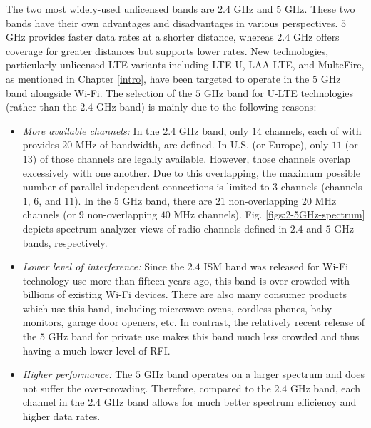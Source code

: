 The two most widely-used unlicensed bands are $2.4$ GHz and $5$ GHz. These two bands have their own advantages and disadvantages in various perspectives. $5$ GHz provides faster data rates at a shorter distance, whereas $2.4$ GHz offers coverage for greater distances but supports lower rates. New technologies, particularly unlicensed LTE variants including \mbox{LTE-U}, \mbox{LAA-LTE}, and MulteFire, as mentioned in Chapter \ref{intro}, have been targeted to operate in the $5$ GHz band alongside \mbox{Wi-Fi}. The selection of the $5$ GHz band for \mbox{U-LTE} technologies (rather than the $2.4$ GHz band) is mainly due to the following reasons:
\begin{itemize}
\item
\textit{More available channels:} In the $2.4$ GHz band, only $14$ channels, each of with provides $20$ MHz of bandwidth, are defined. In U.S. (or Europe), only $11$ (or $13$) of those channels are legally available. However, those channels overlap excessively with one another. Due to this overlapping, the maximum possible number of parallel independent connections is limited to $3$ channels (channels $1$, $6$, and $11$). In the $5$ GHz band, there are $21$ non-overlapping $20$ MHz channels (or $9$ non-overlapping $40$ MHz channels). Fig. \ref{figs:2-5GHz-spectrum} depicts spectrum analyzer views of radio channels defined in $2.4$ and $5$ GHz bands, respectively.
\item
\textit{Lower level of interference:} Since the $2.4$ ISM band was released for \mbox{Wi-Fi} technology use more than fifteen years ago, this band is over-crowded with billions of existing \mbox{Wi-Fi} devices. There are also many consumer products which use this band, including microwave ovens, cordless phones, baby monitors, garage door openers, etc. In contrast, the relatively recent release of the $5$ GHz band for private use makes this band much less crowded and thus having a much lower level of RFI. 
\item
\textit{Higher performance:} The $5$ GHz band operates on a larger spectrum and does not suffer the over-crowding. Therefore, compared to the $2.4$ GHz band, each channel in the $2.4$ GHz band allows for much better spectrum efficiency and higher data rates.
\end{itemize}
